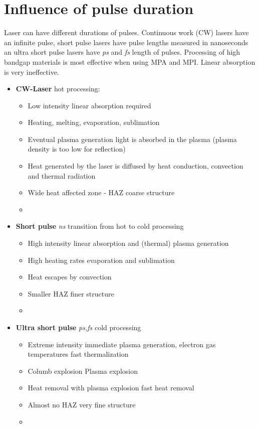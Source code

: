 \section{Influence of pulse duration}
Laser can have different durations of pulses. Continuous work (CW) lasers have an infinite pulse, short pulse lasers have pulse lengths measured in nanoseconds an ultra short pulse lasers have \textit{ps } and \textit{fs} length of pulses.
Processing of high bandgap materials is most effective when using MPA and MPI. Linear absorption is very ineffective. 

\begin{itemize}
    \item[] \textbf{CW-Laser} \pd hot processing:
     \begin{itemize}
        \item Low intensity \pd linear absorption required
        \item Heating, melting, evaporation, sublimation
        \item Eventual plasma generation \pd light is absorbed in the plasma (plasma density is too low for reflection)
        \item Heat generated by the laser is diffused by heat conduction, convection and thermal radiation
        \item Wide heat affected zone - HAZ \pd coarse structure
        \item[]
    \end{itemize}

    \item[] \textbf{Short pulse} \textit{ns} \pd transition from hot to cold processing
     \begin{itemize}
        \item High intensity \pd linear absorption and (thermal) plasma generation
        \item High heating rates \pd evaporation and sublimation
        \item Heat escapes by convection
        \item Smaller HAZ \pd finer structure
        \item[] 
     \end{itemize}

     \item[] \textbf{Ultra short pulse} \textit{ps,fs} \pd cold processing
     \begin{itemize}
        \item Extreme intensity \pd immediate plasma generation, electron gas temperatures \pd fast thermalization
        \item Columb explosion \pd Plasma explosion
        \item Heat removal with plasma explosion \pd fast heat removal
        \item Almost no HAZ \pd very fine structure
        \item[]
     \end{itemize}
\end{itemize}

